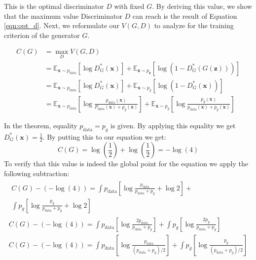This is the optimal discriminator $D$ with fixed $G$. By deriving this value, we show that the
maximum value Discriminator $D$ can reach is the result of Equation \ref{eqn:opt_d}. Next, we reformulate our
$V(G, D)$ to analyze for the training criterion of the generator $G$. 

\begin{align}
    C(G) &= \max _{D} V(G, D) \\[5pt]
    & =\mathbb{E}_{\boldsymbol{x} \sim p_{\mathrm{data}}}\left[\log D_{G}^{*}(\boldsymbol{x})\right]+\mathbb{E}_{\boldsymbol{z} \sim p_{\boldsymbol{z}}}\left[\log \left(1-D_{G}^{*}(G(\boldsymbol{z}))\right)\right] \\[5pt]
    & =\mathbb{E}_{\boldsymbol{x} \sim p_{\mathrm{data}}}\left[\log D_{G}^{*}(\boldsymbol{x})\right]+\mathbb{E}_{\boldsymbol{x} \sim p_{g}}\left[\log \left(1-D_{G}^{*}(\boldsymbol{x})\right)\right] \\[5pt]
    & =\mathbb{E}_{\boldsymbol{x} \sim p_{\mathrm{data}}}\left[\log \frac{p_{\mathrm{data}}(\boldsymbol{x})}{P_{\mathrm{data}}(\boldsymbol{x})+p_{g}(\boldsymbol{x})}\right]+\mathbb{E}_{\boldsymbol{x} \sim p_{g}}\left[\log \frac{p_{g}(\boldsymbol{x})}{p_{\mathrm{data}}(\boldsymbol{x})+p_{g}(\boldsymbol{x})}\right] 
\end{align}

In the theorem, equality $ p_{\text{data}} = p_g$ is given. By applying this equality we get
$D^{*}_G(\boldsymbol{x}) = \frac{1}{2}$. By putting this to our equation we get:
 $$C(G) = \log(\frac{1}{2}) + \log(\frac{1}{2}) = - \log(4)$$
To verify that this value is indeed the global
point for the equation we apply the following subtraction: 
\begin{multline}
    \label{eqn:gan_optim_proof}
    \begin{split}
        C(G)-(-\log (4))  =\int p_{\text {data}}\left[\log \frac{p_{\text {data}}}{p_{\text {data}}+p_{g}}+\log 2\right]+\\ \int p_{g}\left[\log \frac{p_{g}}{p_{\text {data}}+p_{g}}+\log 2\right]
    \end{split}\\[5pt]
    C(G)-(-\log (4)) =\int p_{\text {data}}\left[\log \frac{2 p_{\text {data}}}{p_{\text {data}}+p_{g}}\right]+\int p_{g}\left[\log \frac{2 p_{g}}{p_{\text {data}}+p_{g}}\right]\\[5pt]
    C(G)-(-\log (4)) =\int p_{\text {data}}\left[\log \frac{p_{\text {data}}}{\left(p_{\text {data}}+p_{g}\right) / 2}\right]+\int p_{g}\left[\log \frac{p_{g}}{\left(p_{\text {data}}+p_{g}\right) / 2}\right]
\end{multline}


